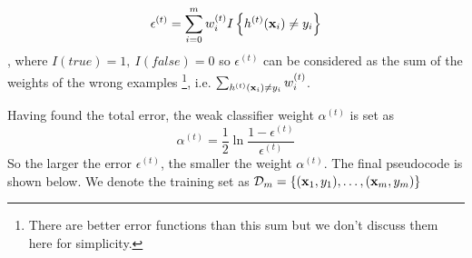 \documentclass[a4paper]{article}
\begin{document}
\begin{equation}
    \epsilon^{(t)} = \sum_{i=0}^{m}{w^{(t)}_i}I\left\{h^{(t)}(\textbf{x}_i)\neq y_i \right\}
\end{equation}
, where $I(true) = 1, \ I(false) = 0$ so $\epsilon^{(t)}$ can be considered as the sum of the weights of the wrong examples \footnote{There are better error functions than this sum but we don't discuss them here for simplicity.}, i.e. $\sum_{h^{(t)}(\textbf{x}_i)\neq y_i}w^{(t)}_i$. 

Having found the total error, the weak classifier weight $\alpha^{(t)}$ is set as
\begin{equation}
    \alpha^{(t)} = \frac{1}{2}\ln{\frac{1-\epsilon^{(t)}}{\epsilon^{(t)}}}
\end{equation}
So the larger the error $\epsilon^{(t)}$, the smaller the weight $\alpha^{(t)}$. The final pseudocode is shown below. We denote the training set as $\mathcal{D}_m = \left\{(\textbf{x}_1,y_1),\ldots,(\textbf{x}_m,y_m) \right\}$
\end{document}
